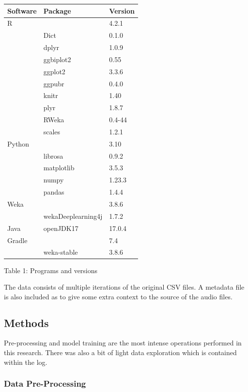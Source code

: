 \documentclass[
]{article}
\begin{document}
\begin{longtable}[]{@{}lll@{}}
\toprule
\textbf{Software} & \textbf{Package} & \textbf{Version} \\
\midrule
\endhead
R & & 4.2.1 \\
& Dict & 0.1.0 \\
& dplyr & 1.0.9 \\
& ggbiplot2 & 0.55 \\
& ggplot2 & 3.3.6 \\
& ggpubr & 0.4.0 \\
& knitr & 1.40 \\
& plyr & 1.8.7 \\
& RWeka & 0.4-44 \\
& scales & 1.2.1 \\
Python & & 3.10 \\
& librosa & 0.9.2 \\
& matplotlib & 3.5.3 \\
& numpy & 1.23.3 \\
& pandas & 1.4.4 \\
Weka & & 3.8.6 \\
& wekaDeeplearning4j & 1.7.2 \\
Java & openJDK17 & 17.0.4 \\
Gradle & & 7.4 \\
& weka-stable & 3.8.6 \\
\bottomrule
\end{longtable}

\begin{center}
Table 1: Programs and versions \label{tab:tab1}
\end{center}

The data consists of multiple iterations of the original CSV files. A
metadata file is also included as to give some extra context to the
source of the audio files.

\newpage

\hypertarget{methods}{%
\subsection{Methods}\label{methods}}

Pre-processing and model training are the most intense operations
performed in this research. There was also a bit of light data
exploration which is contained within the log.

\hypertarget{data-pre-processing}{%
\subsubsection{Data Pre-Processing}\label{data-pre-processing}}
\end{document}

